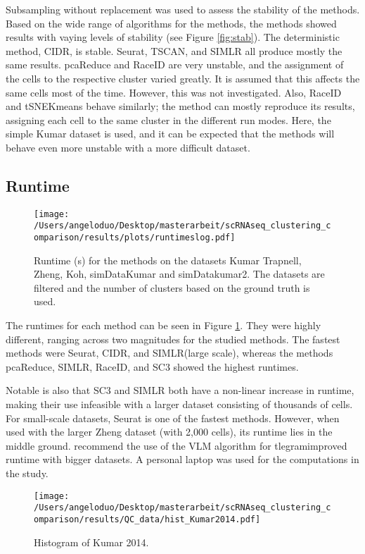 \documentclass[12pt, a4paper]{article}\usepackage[]{graphicx}\usepackage[]{color}
\begin{document}
Subsampling without replacement was used to assess the stability of the methods. Based on the wide range of algorithms for the methods, the methods showed results with vaying levels of stability (see Figure \ref{fig:stab}). The deterministic method, CIDR, is stable. Seurat, TSCAN, and SIMLR all produce mostly the same results. pcaReduce and RaceID are very unstable, and the assignment of the cells to the respective cluster varied greatly. It is assumed that this affects the same cells most of the time. However, this was not investigated. Also, RaceID and tSNEKmeans behave similarly; the method can mostly reproduce its results, assigning each cell to the same cluster in the different run modes. Here, the simple Kumar dataset is used, and it can be expected that the methods will behave even more unstable with a more difficult dataset.  

\subsection{Runtime} 

\begin{figure}[!h]
\texttt{[image: /Users/angeloduo/Desktop/masterarbeit/scRNAseq\_clustering\_comparison/results/plots/runtimeslog.pdf]}
\caption{Runtime (s) for the methods on the datasets Kumar Trapnell, Zheng, Koh, simDataKumar and simDatakumar2. The datasets are filtered and the number of clusters based on the ground truth is used.}
\label{fig:runtimelog}
\end{figure}
The runtimes for each method can be seen in Figure \ref{fig:runtimelog}. They were highly different, ranging across two magnitudes for the studied methods. The fastest methods were Seurat, CIDR, and SIMLR(large scale), whereas the methods pcaReduce, SIMLR, RaceID, and SC3 showed the highest runtimes. 

Notable is also that SC3 and SIMLR both have a non-linear increase in runtime, making their use infeasible with a larger dataset consisting of thousands of cells. For small-scale datasets, Seurat is one of the fastest methods. However, when used with the larger Zheng dataset (with 2,000 cells), its runtime lies in the middle ground. \citet{butler2017integrated} recommend the use of the VLM algorithm for tlegramimproved runtime with bigger datasets. 
A personal laptop was used for the computations in the study.


\newpage



\begin{figure}[!h]
\texttt{[image: /Users/angeloduo/Desktop/masterarbeit/scRNAseq\_clustering\_comparison/results/QC\_data/hist\_Kumar2014.pdf]}
\caption{Histogram of Kumar 2014.}
\label{fig:histkumar}
\end{figure}
\end{document}
